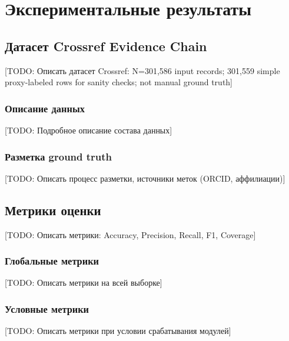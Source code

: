 
\chapter{Экспериментальные результаты}
\label{ch:experiments}

\section{Датасет Crossref Evidence Chain}
\label{sec:exp:dataset}

[TODO: Описать датасет Crossref: N=301,586 input records; 301,559 simple proxy-labeled rows for sanity checks; not manual ground truth]

\subsection{Описание данных}
\label{subsec:exp:data_description}

[TODO: Подробное описание состава данных]

\subsection{Разметка ground truth}
\label{subsec:exp:ground_truth}

[TODO: Описать процесс разметки, источники меток (ORCID, аффилиации)]

\section{Метрики оценки}
\label{sec:exp:metrics}

[TODO: Описать метрики: Accuracy, Precision, Recall, F1, Coverage]

\subsection{Глобальные метрики}
\label{subsec:exp:global_metrics}

[TODO: Описать метрики на всей выборке]

\subsection{Условные метрики}
\label{subsec:exp:conditional_metrics}

[TODO: Описать метрики при условии срабатывания модулей]

